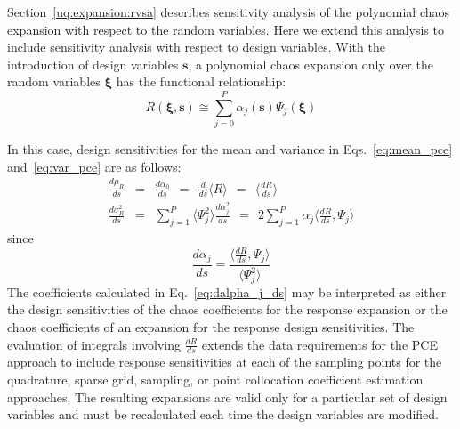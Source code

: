 Section~\ref{uq:expansion:rvsa} describes sensitivity analysis of the
polynomial chaos expansion with respect to the random variables.  Here
we extend this analysis to include sensitivity analysis with respect
to design variables.  With the introduction of design variables
$\boldsymbol{s}$, a polynomial chaos expansion only over the random
variables $\boldsymbol{\xi}$ has the functional relationship:
\begin{equation}
R(\boldsymbol{\xi}, \boldsymbol{s}) \cong \sum_{j=0}^P \alpha_j(\boldsymbol{s}) 
\Psi_j(\boldsymbol{\xi}) \label{eq:R_alpha_s_psi_xi}
\end{equation}

\noindent In this case, design sensitivities for the mean and variance 
in Eqs.~\ref{eq:mean_pce} and~\ref{eq:var_pce} are as follows:
\begin{eqnarray}
\frac{d\mu_R}{ds} &=& \frac{d\alpha_0}{ds} 
~~=~~ \frac{d}{ds} \langle R \rangle 
~~=~~ \langle \frac{dR}{ds} \rangle \label{eq:dmuR_ds_unc_pce} \\
\frac{d\sigma^2_R}{ds} &=& \sum_{j=1}^P \langle \Psi_j^2 \rangle 
\frac{d\alpha_j^2}{ds}
~~=~~ 2 \sum_{j=1}^P \alpha_j \langle \frac{dR}{ds}, \Psi_j \rangle 
\label{eq:dsigR_ds_unc_pce}
\end{eqnarray}
since
\begin{equation}
\frac{d\alpha_j}{ds} = \frac{\langle \frac{dR}{ds}, \Psi_j \rangle}
{\langle \Psi^2_j \rangle} \label{eq:dalpha_j_ds}
\end{equation}
The coefficients calculated in Eq.~\ref{eq:dalpha_j_ds} may be
interpreted as either the design sensitivities of the chaos
coefficients for the response expansion or the chaos coefficients of
an expansion for the response design sensitivities.  The evaluation of
integrals involving $\frac{dR}{ds}$ extends the data requirements for
the PCE approach to include response sensitivities at each of the
sampling points for the quadrature, sparse grid, sampling, or point
collocation coefficient estimation approaches.  The resulting
expansions are valid only for a particular set of design variables and
must be recalculated each time the design variables are modified.

